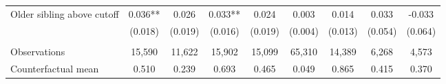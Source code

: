 {{\begin{tabular}{lcccccccc}
Older sibling above cutoff&       0.036** &       0.026   &       0.033** &       0.024   &       0.003   &       0.014   &       0.033   &      -0.033   \\
                    &     (0.018)   &     (0.019)   &     (0.016)   &     (0.019)   &     (0.004)   &     (0.013)   &     (0.054)   &     (0.064)   \\
                    &               &               &               &               &               &               &               &               \\
Observations        &      15,590   &      11,622   &      15,902   &      15,099   &      65,310   &      14,389   &       6,268   &       4,573   \\
Counterfactual mean &       0.510   &       0.239   &       0.693   &       0.465   &       0.049   &       0.865   &       0.415   &       0.370   \\
 

\bottomrule
\end{tabular}
}
}
